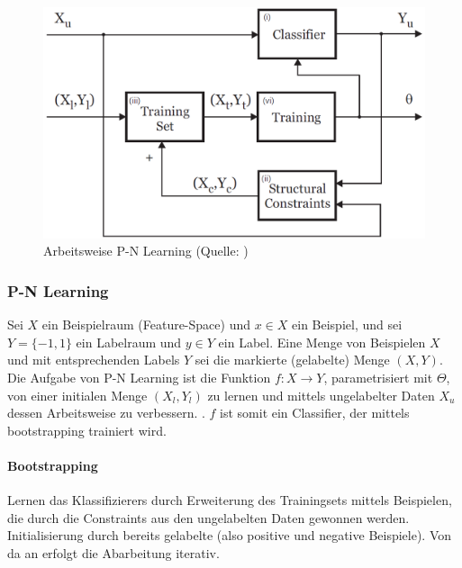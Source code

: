 \begin{figure}
\begin{centering}
\includegraphics[scale=0.4]{../pictures/PN_LEARNING.png}\caption{Arbeitsweise P-N Learning (Quelle: \cite{PNL})}
\label{PNL_Pic}
\par\end{centering}
\end{figure}

\subsubsection{P-N Learning}

Sei $X$ ein Beispielraum (Feature-Space) und $x\in X$ ein Beispiel, und sei $Y=\{-1,1\}$ ein Labelraum und $y\in Y$ ein Label. Eine Menge von Beispielen $X$ und mit entsprechenden Labels $Y$ sei die markierte (gelabelte) Menge $(X,Y)$. Die Aufgabe von P-N Learning ist die Funktion $f:X\rightarrow Y$, parametrisiert mit $\Theta$, von einer initialen Menge $(X_{l},Y_{l})$ zu lernen und mittels ungelabelter Daten $X_{u}$ dessen Arbeitsweise zu verbessern. . $f$ ist somit ein Classifier, der mittels bootstrapping trainiert wird.

\paragraph{Bootstrapping}
Lernen das Klassifizierers durch Erweiterung des Trainingsets mittels Beispielen, die durch die Constraints aus den ungelabelten Daten gewonnen werden. Initialisierung durch bereits gelabelte (also positive und negative Beispiele). Von da an erfolgt die Abarbeitung iterativ.

